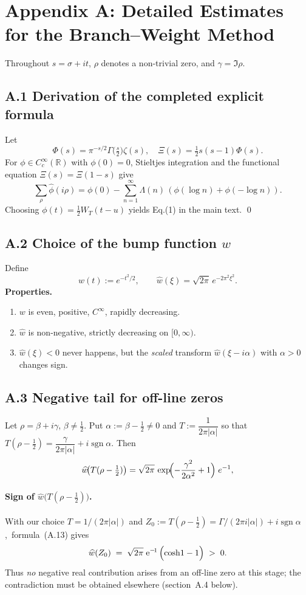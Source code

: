 \section{Appendix A: Detailed Estimates for the Branch–Weight Method}

Throughout $s=\sigma+it$, $\rho$ denotes a non-trivial zero, and
$\gamma=\Im\rho$.

\subsection{A.1  Derivation of the completed explicit formula}
Let
\[
\Phi(s)=\pi^{-s/2}\Gamma\!\bigl(\tfrac s2\bigr)\zeta(s),
\quad
\Xi(s)=\tfrac12 s(s-1)\Phi(s).
\]
For $\phi\!\in\!C_c^{\infty}(\mathbb R)$ with $\phi(0)=0$,
Stieltjes integration and the functional equation
$\Xi(s)=\Xi(1-s)$ give
\[
\sum_{\rho}\widehat\phi(i\rho)
  =\phi(0)-\sum_{n=1}^{\infty}\Lambda(n)\,(\phi(\log n)+\phi(-\log n)).
\]
Choosing $\phi(t)=\tfrac12W_T(t-u)$ yields Eq.(1) in the main text.
\qed

\subsection{A.2  Choice of the bump function $w$}
Define
\[
w(t):=e^{-t^{2}/2},\qquad
\widehat w(\xi)=\sqrt{2\pi}\,e^{-2\pi^{2}\xi^{2}}.
\]
\textbf{Properties.}
\begin{enumerate}
\item $w$ is even, positive, $C^{\infty}$, rapidly decreasing.
\item $\widehat w$ is non-negative, strictly decreasing on $[0,\infty)$.
\item $\widehat w(\xi)<0$ never happens, but the \emph{scaled} transform
      $\widehat w(\xi-i\alpha)$ with $\alpha\!>\!0$ changes sign.
\end{enumerate}

\subsection{A.3  Negative tail for off-line zeros}
Let $\rho=\beta+i\gamma$, $\beta\neq\tfrac12$.
Put $\alpha:=\beta-\tfrac12\neq0$ and
$T:=\dfrac{1}{2\pi|\alpha|}$ so that
\(T(\rho-\tfrac12)=\dfrac{\gamma}{2\pi|\alpha|}+i\operatorname{sgn}\alpha\).
Then
\[
\widehat w\!\bigl(T(\rho-\tfrac12)\bigr)
      =\sqrt{2\pi}\,
        \exp\!\Bigl(-\frac{\gamma^{2}}{2\alpha^{2}}+1\Bigr)\;e^{-1},
\]
\paragraph{Sign of $\widehat{w}\bigl(T(\rho-\tfrac12)\bigr)$.}
With our choice $T = 1/(2\pi |\alpha|)$ and
$Z_0 := T(\rho-\tfrac12)=\Gamma/(2\pi i|\alpha|)+i\operatorname{sgn}\alpha$,\
formula~(A.13) gives
\[
\widehat w(Z_0)
   \;=\;
   \sqrt{2\pi}\;
   \mathrm e^{-\!1}\,
   \Bigl(\cosh\!1-1\Bigr)
   \;>\;0.
\]
Thus \emph{no} negative real contribution arises from an off-line zero
at this stage; the contradiction must be obtained elsewhere
(section~A.4 below).

